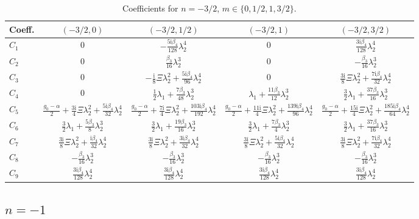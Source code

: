 \documentclass[11pt]{article}
\newcommand{\ii}{\mathrm{i}}
\begin{document}
\begin{table}[htbp]
\centering\small
\caption{Coefficients for $n=-3/2$, $m\in\{0,1/2,1,3/2\}$.}
\begin{tabular}{lcccc}
\toprule
Coeff. & $(-3/2,0)$ & $(-3/2,1/2)$ & $(-3/2,1)$ & $(-3/2,3/2)$ \\
\midrule
$C_1$ & $0$ & $-\tfrac{5\ii\beta_4}{128}\lambda_2^4$ & $0$ & $\tfrac{3\ii\beta_4}{128}\lambda_2^4$ \\
$C_2$ & $0$ & $\tfrac{\beta_3}{16}\lambda_2^3$ & $0$ & $-\tfrac{\beta_3}{16}\lambda_2^3$ \\
$C_3$ & $0$ & $-\tfrac{\ii}{8}\Xi\lambda_2^2+\tfrac{5\ii\beta_4}{96}\lambda_2^4$ & $0$ & $\tfrac{3\ii}{8}\Xi\lambda_2^2+\tfrac{7\ii\beta_4}{32}\lambda_2^4$ \\
$C_4$ & $0$ & $\tfrac12\lambda_1+\tfrac{7\beta_3}{48}\lambda_2^3$ & $\lambda_1+\tfrac{11\beta_3}{12}\lambda_2^3$ & $\tfrac32\lambda_1+\tfrac{37\beta_3}{16}\lambda_2^3$ \\
$C_5$ & $\tfrac{g_0-\alpha}{2}+\tfrac{3\ii}{4}\Xi\lambda_2^2+\tfrac{5\ii\beta_4}{32}\lambda_2^4$ & $\tfrac{g_0-\alpha}{2}+\tfrac{7\ii}{4}\Xi\lambda_2^2+\tfrac{103\ii\beta_4}{192}\lambda_2^4$ & $\tfrac{g_0-\alpha}{2}+\tfrac{11\ii}{4}\Xi\lambda_2^2+\tfrac{139\ii\beta_4}{96}\lambda_2^4$ & $\tfrac{g_0-\alpha}{2}+\tfrac{15\ii}{4}\Xi\lambda_2^2+\tfrac{185\ii\beta_4}{64}\lambda_2^4$ \\
$C_6$ & $\tfrac32\lambda_1+\tfrac{5\beta_3}{8}\lambda_2^3$ & $\tfrac32\lambda_1+\tfrac{19\beta_3}{16}\lambda_2^3$ & $\tfrac32\lambda_1+\tfrac{7\beta_3}{4}\lambda_2^3$ & $\tfrac32\lambda_1+\tfrac{37\beta_3}{16}\lambda_2^3$ \\
$C_7$ & $\tfrac{3\ii}{8}\Xi\lambda_2^2+\tfrac{\ii\beta_4}{32}\lambda_2^4$ & $\tfrac{3\ii}{8}\Xi\lambda_2^2+\tfrac{3\ii\beta_4}{32}\lambda_2^4$ & $\tfrac{3\ii}{8}\Xi\lambda_2^2+\tfrac{5\ii\beta_4}{32}\lambda_2^4$ & $\tfrac{3\ii}{8}\Xi\lambda_2^2+\tfrac{7\ii\beta_4}{32}\lambda_2^4$ \\
$C_8$ & $-\tfrac{\beta_3}{16}\lambda_2^3$ & $-\tfrac{\beta_3}{16}\lambda_2^3$ & $-\tfrac{\beta_3}{16}\lambda_2^3$ & $-\tfrac{\beta_3}{16}\lambda_2^3$ \\
$C_9$ & $\tfrac{3\ii\beta_4}{128}\lambda_2^4$ & $\tfrac{3\ii\beta_4}{128}\lambda_2^4$ & $\tfrac{3\ii\beta_4}{128}\lambda_2^4$ & $\tfrac{3\ii\beta_4}{128}\lambda_2^4$ \\
\bottomrule
\end{tabular}
\end{table}

\subsection{$n=-1$}
\end{document}
